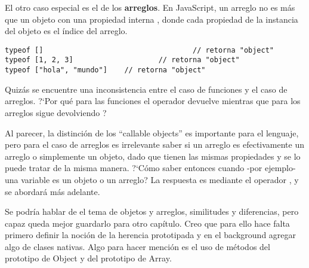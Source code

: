 El otro caso especial es el de los \textbf{arreglos}. En JavaScript, un arreglo no es más que un objeto con una propiedad interna , donde cada propiedad de la instancia del objeto es el índice del arreglo.

\begin{lstlisting}[title={Analizando \code{typeof} de arreglos}]
typeof []									// retorna "object"
typeof [1, 2, 3]					// retorna "object"
typeof ["hola", "mundo"]	// retorna "object"
\end{lstlisting}

Quizás se encuentre una inconsistencia entre el caso de funciones y el caso de arreglos. ?`Por qué para las funciones el operador  devuelve  mientras que para los arreglos sigue devolviendo ? 

Al parecer, la distinción de los "`callable objects"' es importante para el lenguaje, pero para el caso de arreglos es irrelevante saber si un arreglo es efectivamente un arreglo o simplemente un objeto, dado que tienen las mismas propiedades y se lo puede tratar de la misma manera. ?`Cómo saber entonces cuando -por ejemplo- una variable es un objeto o un arreglo? La respuesta es mediante el operador , y se abordará más adelante.

{\color{red} Se podría hablar de el tema de objetos y arreglos, similitudes y diferencias, pero capaz queda mejor guardarlo para otro capítulo. Creo que para ello hace falta primero definir la noción de la herencia prototipada y en el background agregar algo de clases nativas. Algo para hacer mención es el uso de métodos del prototipo de Object y del prototipo de Array.}




